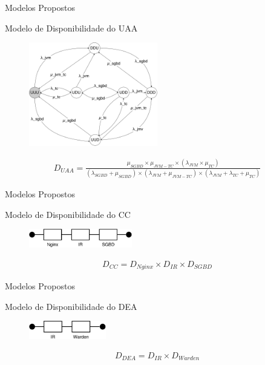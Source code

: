 \documentclass{beamer}
\begin{document}
    \begin{frame}{Modelos Propostos}
    
        Modelo de Disponibilidade do UAA
    
        \begin{figure}[ht]
            \includegraphics[width=0.50\textwidth]{img/cadeia-markov.pdf}
        \end{figure}
        
        \begin{align*}
         D_{UAA} = \frac{\mu_{SGBD} \times \mu_{JVM-TC} \times (\lambda_{JVM} \times \mu_{TC})}
                {(\lambda_{SGBD} + \mu_{SGBD}) \times (\lambda_{JVM} + \mu_{JVM-TC}) \times (\lambda_{JVM} + \lambda_{TC} + \mu_{TC})}
        \end{align*}

    \end{frame}
    
    \begin{frame}{Modelos Propostos}
        
        Modelo de Disponibilidade do CC
    
        \begin{figure}[ht]
            \includegraphics[width=0.4\textwidth]{img/cc.eps}
        \end{figure}
        
        \begin{align*}
            D_{CC} = D_{Nginx} \times D_{IR} \times D_{SGBD}
        \end{align*}

    \end{frame}
    
    \begin{frame}{Modelos Propostos}
    
        Modelo de Disponibilidade do DEA
        
        \begin{figure}[ht]
            \includegraphics[width=0.3\textwidth]{img/dea.eps}
        \end{figure}
        
        \begin{align*}
            D_{DEA} = D_{IR} \times D_{Warden}
        \end{align*}

    \end{frame}
    
\end{document}
